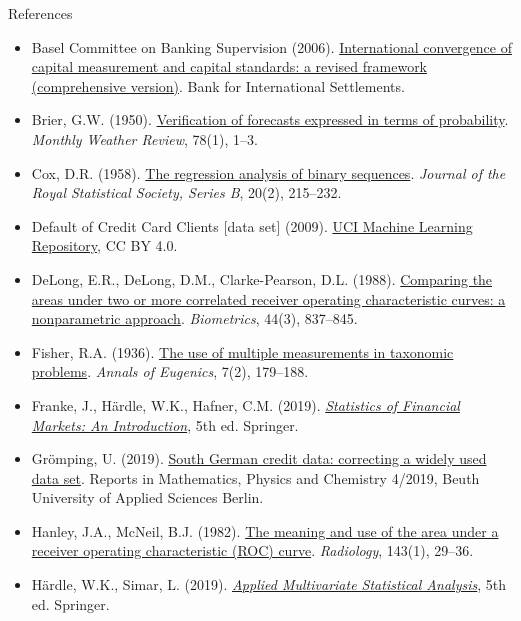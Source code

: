 \begin{frame}{References}
\itemsize{\tiny}
\begin{itemize}
    \item Basel Committee on Banking Supervision (2006). \href{https://www.bis.org/publ/bcbs128.htm}{International convergence of capital measurement and capital standards: a revised framework (comprehensive version)}. Bank for International Settlements.
    \item Brier, G.W. (1950). \href{https://doi.org/10.1175/1520-0493(1950)078<0001:VOFEIT>2.0.CO;2}{Verification of forecasts expressed in terms of probability}. \textit{Monthly Weather Review}, 78(1), 1--3.
    \item Cox, D.R. (1958). \href{https://doi.org/10.1111/j.2517-6161.1958.tb00292.x}{The regression analysis of binary sequences}. \textit{Journal of the Royal Statistical Society, Series B}, 20(2), 215--232.
    \item Default of Credit Card Clients [data set] (2009). \href{https://doi.org/10.24432/C55S3H}{UCI Machine Learning Repository}, CC BY 4.0.
    \item DeLong, E.R., DeLong, D.M., Clarke-Pearson, D.L. (1988). \href{https://doi.org/10.2307/2531595}{Comparing the areas under two or more correlated receiver operating characteristic curves: a nonparametric approach}. \textit{Biometrics}, 44(3), 837--845.
    \item Fisher, R.A. (1936). \href{https://doi.org/10.1111/j.1469-1809.1936.tb02137.x}{The use of multiple measurements in taxonomic problems}. \textit{Annals of Eugenics}, 7(2), 179--188.
    \item Franke, J., Härdle, W.K., Hafner, C.M. (2019). \href{https://doi.org/10.1007/978-3-030-13751-9}{\textit{Statistics of Financial Markets: An Introduction}}, 5th ed. Springer.
    \item Grömping, U. (2019). \href{http://www1.beuth-hochschule.de/FB_II/reports/Report-2019-004.pdf}{South German credit data: correcting a widely used data set}. Reports in Mathematics, Physics and Chemistry 4/2019, Beuth University of Applied Sciences Berlin.
    \item Hanley, J.A., McNeil, B.J. (1982). \href{https://doi.org/10.1148/radiology.143.1.7063747}{The meaning and use of the area under a receiver operating characteristic (ROC) curve}. \textit{Radiology}, 143(1), 29--36.
    \item Härdle, W.K., Simar, L. (2019). \href{https://doi.org/10.1007/978-3-030-26006-4}{\textit{Applied Multivariate Statistical Analysis}}, 5th ed. Springer.

\end{itemize}
\end{frame}
